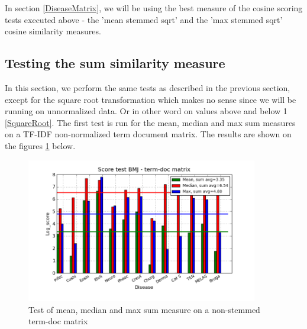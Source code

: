 In section \ref{DiseaseMatrix}, we will be using the best measure of the cosine scoring tests 
executed above - the 'mean stemmed sqrt' and the 'max stemmed sqrt' cosine similarity measures.

\subsection{Testing the sum similarity measure\label{TestingSumSimilarity}}

In this section, we perform the same tests as described in the previous section, except for the square 
root transformation which makes no sense since we will be running on unnormalized data. Or in 
other word on values above and below 1 \ref{SquareRoot}. The first test is run for the mean, 
median and max sum measures on a TF-IDF non-normalized term document matrix. The results are 
shown on the figures \ref{termDoc_bmj_hist_3000_sum_mea_med_max} below. 

\begin{figure}[H]
        \begin{center}
          \includegraphics[width=0.9\textwidth]{barcharts/termDoc_bmj_hist_3000_sum_mea_med_max.png}
        \end{center}
        \caption{Test of mean, median and max sum measure on a non-stemmed term-doc matrix}
        \label{termDoc_bmj_hist_3000_sum_mea_med_max}
\end{figure}

